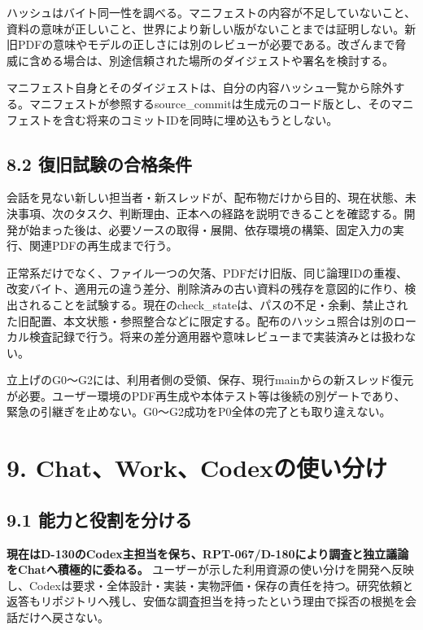 \documentclass[11pt,a4paper]{article}
\begin{document}
ハッシュはバイト同一性を調べる。マニフェストの内容が不足していないこと、資料の意味が正しいこと、世界により新しい版がないことまでは証明しない。新旧PDFの意味やモデルの正しさには別のレビューが必要である。改ざんまで脅威に含める場合は、別途信頼された場所のダイジェストや署名を検討する。

マニフェスト自身とそのダイジェストは、自分の内容ハッシュ一覧から除外する。マニフェストが参照するsource\_commitは生成元のコード版とし、そのマニフェストを含む将来のコミットIDを同時に埋め込もうとしない。

\subsection{8.2
復旧試験の合格条件}\label{ux5fa9ux65e7ux8a66ux9a13ux306eux5408ux683cux6761ux4ef6}

会話を見ない新しい担当者・新スレッドが、配布物だけから目的、現在状態、未決事項、次のタスク、判断理由、正本への経路を説明できることを確認する。開発が始まった後は、必要ソースの取得・展開、依存環境の構築、固定入力の実行、関連PDFの再生成まで行う。

正常系だけでなく、ファイル一つの欠落、PDFだけ旧版、同じ論理IDの重複、改変バイト、適用元の違う差分、削除済みの古い資料の残存を意図的に作り、検出されることを試験する。現在のcheck\_stateは、パスの不足・余剰、禁止された旧配置、本文状態・参照整合などに限定する。配布のハッシュ照合は別のローカル検査記録で行う。将来の差分適用器や意味レビューまで実装済みとは扱わない。

立上げのG0〜G2には、利用者側の受領、保存、現行mainからの新スレッド復元が必要。ユーザー環境のPDF再生成や本体テスト等は後続の別ゲートであり、緊急の引継ぎを止めない。G0〜G2成功をP0全体の完了とも取り違えない。

\section{9.
Chat、Work、Codexの使い分け}\label{chatworkcodexux306eux4f7fux3044ux5206ux3051}

\subsection{9.1
能力と役割を分ける}\label{ux80fdux529bux3068ux5f79ux5272ux3092ux5206ux3051ux308b}

\textbf{現在はD-130のCodex主担当を保ち、RPT-067/D-180により調査と独立議論をChatへ積極的に委ねる。}
ユーザーが示した利用資源の使い分けを開発へ反映し、Codexは要求・全体設計・実装・実物評価・保存の責任を持つ。研究依頼と返答もリポジトリへ残し、安価な調査担当を持ったという理由で採否の根拠を会話だけへ戻さない。
\end{document}
